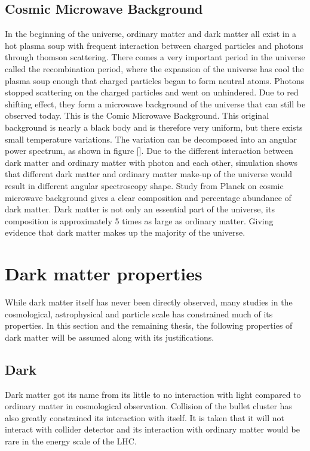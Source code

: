 \subsection {Cosmic Microwave Background}

In the beginning of the universe, ordinary matter and dark matter all exist in a hot plasma soup with frequent interaction between charged particles and photons through thomson scattering. There comes a very important period in the universe called the recombination period, where the expansion of the universe has cool the plasma soup enough that charged particles began to form neutral atoms. Photons stopped scattering on the charged particles and went on unhindered. Due to red
shifting effect, they form a microwave background of the universe that can still be observed today. This is the Comic Microwave Background. 
This original background is nearly a black body and is therefore very uniform, but there exists small temperature variations. The variation can be decomposed into an angular power spectrum, as shown in figure []. 
Due to the different interaction between dark matter and ordinary matter with photon and each other, simulation shows that different dark matter and ordinary matter make-up of the universe would result in different angular spectroscopy shape. 
Study from Planck on cosmic microwave background gives a clear composition and percentage abundance of dark matter. Dark matter is not only an essential part of the universe, its composition is approximately 5 times as large as ordinary matter. Giving evidence that dark matter makes up the majority of the universe. 

\section{Dark matter properties}
While dark matter itself has never been directly observed, many studies in the cosmological, astrophysical and particle scale has constrained much of its properties. In this section and the remaining thesis, the following properties of dark matter will be assumed along with its justifications.

\subsection{Dark}
Dark matter got its name from its little to no interaction with light compared to ordinary matter in cosmological observation. Collision of the bullet cluster has also greatly constrained its interaction with itself.  
It is taken that it will not interact with collider detector and its interaction with ordinary matter would be rare in the energy scale of the LHC. 

